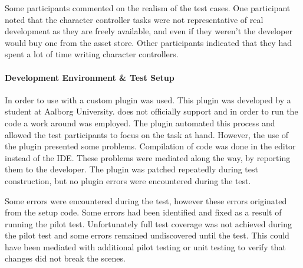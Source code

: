 Some participants commented on the realism of the test cases. One participant noted that the character controller tasks were not representative of real development as they are freely available, and even if they weren't the developer would buy one from the asset store. Other participants indicated that they had spent a lot of time writing character controllers.

\paragraph{Development Environment \& Test Setup}
In order to use \fs with \unity a custom plugin was used. This plugin was developed by a student at Aalborg University\cite{fsharp2019plugin}. \unity does not officially support \fs and in order to run the \fs code a work around was employed. The plugin automated this process and allowed the test participants to focus on the task at hand. However, the use of the plugin presented some problems. Compilation of \fs code was done in the \unity editor instead of the \gls{IDE}. These problems were mediated along the way, by reporting them to the developer. The plugin was patched repeatedly during test construction, but no plugin errors were encountered during the test.

Some errors were encountered during the test, however these errors originated from the setup code. Some errors had been identified and fixed as a result of running the pilot test. Unfortunately full test coverage was not achieved during the pilot test and some errors remained undiscovered until the test. This could have been mediated with additional pilot testing or unit testing to verify that changes did not break the scenes.

